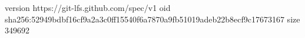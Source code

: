 version https://git-lfs.github.com/spec/v1
oid sha256:52949bdbf16cf9a2a3c0ff15540f6a7870a9fb51019adeb22b8ecf9c17673167
size 349692
